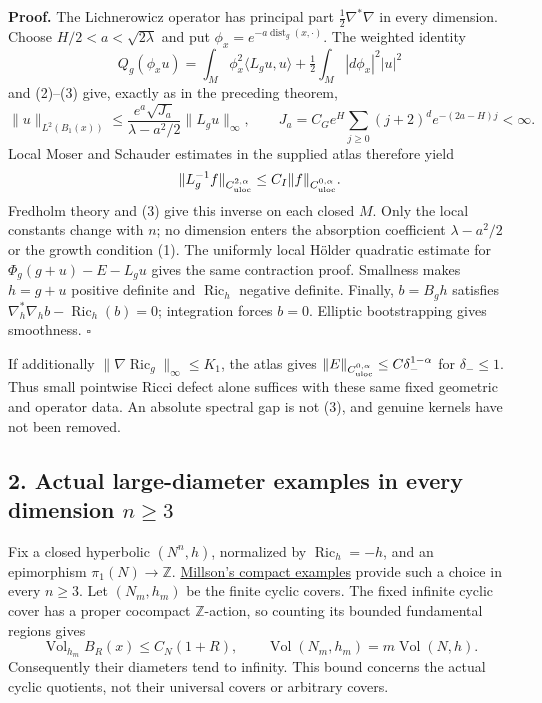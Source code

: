 \documentclass[
  11pt,
]{article}
\begin{document}
\textbf{Proof.} The Lichnerowicz operator has principal part
\(\tfrac12\nabla^*\nabla\) in every dimension. Choose
\(H/2<a<\sqrt{2\lambda}\) and put
\(\phi_x=e^{-a\operatorname{dist}_g(x,\cdot)}\). The weighted identity
\[
 Q_g(\phi_xu)
 =\int_M\phi_x^2\langle L_gu,u\rangle
             +\tfrac12\int_M|d\phi_x|^2|u|^2
\] and (2)--(3) give, exactly as in the preceding theorem, \[
 \|u\|_{L^2(B_1(x))}
 \le \frac{e^a\sqrt{J_a}}{\lambda-a^2/2}\|L_gu\|_\infty,
 \qquad
 J_a=C_Ge^H\sum_{j\ge0}(j+2)^d e^{-(2a-H)j}<\infty.        \tag{5}
\] Local Moser and Schauder estimates in the supplied atlas therefore
yield \[
 \|L_g^{-1}f\|_{C^{2,\alpha}_{\rm uloc}}
                   \le C_I\|f\|_{C^{0,\alpha}_{\rm uloc}}.
\] Fredholm theory and (3) give this inverse on each closed \(M\). Only
the local constants change with \(n\); no dimension enters the
absorption coefficient \(\lambda-a^2/2\) or the growth condition (1).
The uniformly local Hölder quadratic estimate for \(\Phi_g(g+u)-E-L_gu\)
gives the same contraction proof. Smallness makes \(h=g+u\) positive
definite and \(\operatorname{Ric}_h\) negative definite. Finally,
\(b=B_gh\) satisfies \(\nabla_h^*\nabla_hb-\operatorname{Ric}_h(b)=0\);
integration forces \(b=0\). Elliptic bootstrapping gives smoothness.
\(\square\)

If additionally \(\|\nabla\operatorname{Ric}_g\|_\infty\le K_1\), the
atlas gives \(\|E\|_{C^{0,\alpha}_{\rm uloc}} \le C\delta_-^{1-\alpha}\)
for \(\delta_-\le1\). Thus small pointwise Ricci defect alone suffices
with these same fixed geometric and operator data. An absolute spectral
gap is not (3), and genuine kernels have not been removed.

\hypertarget{actual-large-diameter-examples-in-every-dimension-nge3}{%
\subsection{\texorpdfstring{2. Actual large-diameter examples in every
dimension
\(n\ge3\)}{2. Actual large-diameter examples in every dimension n\textbackslash ge3}}\label{actual-large-diameter-examples-in-every-dimension-nge3}}

Fix a closed hyperbolic \((N^n,h)\), normalized by
\(\operatorname{Ric}_h=-h\), and an epimorphism
\(\pi_1(N)\to\mathbb Z\).
\href{https://math.umd.edu/~jjm/papers/bettinumber.pdf}{Millson's
compact examples} provide such a choice in every \(n\ge3\). Let
\((N_m,h_m)\) be the finite cyclic covers. The fixed infinite cyclic
cover has a proper cocompact \(\mathbb Z\)-action, so counting its
bounded fundamental regions gives \[
 \operatorname{Vol}_{h_m}B_R(x)\le C_N(1+R),
 \qquad \operatorname{Vol}(N_m,h_m)=m\operatorname{Vol}(N,h).
\] Consequently their diameters tend to infinity. This bound concerns
the actual cyclic quotients, not their universal covers or arbitrary
covers.
\end{document}
